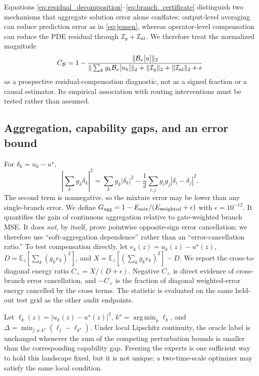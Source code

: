 \documentclass[preprint,12pt]{elsarticle}
\theoremstyle{remark}
\begin{document}
Equations \eqref{eq:residual_decomposition}--\eqref{eq:branch_certificate}
distinguish two mechanisms that aggregate solution error alone conflates:
output-level averaging can reduce prediction error as in
\eqref{eq:jensen}, whereas operator-level compensation can reduce the PDE
residual through $\mathcal I_g+\mathcal I_{\rm nl}$. We therefore treat the
normalized magnitude
\begin{equation}
C_{\mathcal B}
=1-\frac{\|\mathcal B_\nu[u]\|_2}
{\|\sum_k g_k\mathcal B_\nu[u_k]\|_2+
 \|\mathcal I_g\|_2+\|\mathcal I_{\rm nl}\|_2+\epsilon}
\label{eq:residual_compensation_index}
\end{equation}
as a prospective residual-compensation diagnostic, not as a signed fraction
or a causal estimator. Its empirical association with routing interventions
must be tested rather than assumed.

\subsection{Aggregation, capability gaps, and an error bound}
For $\delta_k=u_k-u^\star$,
\begin{equation}
\left|\sum_k g_k\delta_k\right|^2
=\sum_k g_k|\delta_k|^2-\frac12\sum_{i,j}g_ig_j|\delta_i-\delta_j|^2.
\label{eq:jensen}
\end{equation}
The second term is nonnegative, so the mixture error may be lower than any single-branch error\cite{krogh1995}.
We define $G_{\rm agg}=1-E_{\rm mix}/(E_{\rm weighted}+\epsilon)$ with $\epsilon=10^{-12}$. It quantifies the gain of continuous aggregation relative to gate-weighted branch MSE. It does \emph{not}, by itself, prove pointwise opposite-sign error cancellation; we therefore use ``soft-aggregation dependence'' rather than an ``error-cancellation ratio.''
To test compensation directly, let $e_k(z)=u_k(z)-u^\star(z)$, $D=\mathbb E_z\!\left[\sum_k(g_ke_k)^2\right]$, and $X=\mathbb E_z\!\left[(\sum_k g_ke_k)^2\right]-D$. We report the cross-to-diagonal energy ratio $C_\times=X/(D+\epsilon)$. Negative $C_\times$ is direct evidence of cross-branch error cancellation, and $-C_\times$ is the fraction of diagonal weighted-error energy cancelled by the cross terms. The statistic is evaluated on the same held-out test grid as the other audit endpoints.

Let $\ell_k(z)=|u_k(z)-u^\star(z)|^2$, $k^\star=\operatorname*{arg\,min}_k\ell_k$, and $\Delta=\min_{j\ne k^\star}(\ell_j-\ell_{k^\star})$. Under local Lipschitz continuity, the oracle label is unchanged whenever the sum of the competing perturbation bounds is smaller than the corresponding capability gap. Freezing the experts is one sufficient way to hold this landscape fixed, but it is not unique; a two-time-scale optimizer may satisfy the same local condition.
\end{document}
